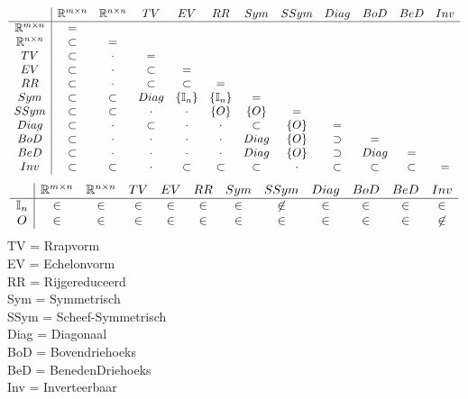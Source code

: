 \documentclass[lineaire_algebra_oplossingen.tex]{subfiles}
\begin{document}
\[
\begin{array}{c | c c c c c c c c c c c}
 & \mathbb{R}^{m\times n} & \mathbb{R}^{n\times n} & TV & EV & RR & Sym & SSym & Diag & BoD & BeD & Inv\\
 \hline
\mathbb{R}^{m\times n} 	& =\\
\mathbb{R}^{n\times n} 	& \subset 	& =\\
TV 						& \subset 	& \cdot 	& =\\
EV 						& \subset 	& \cdot 	& \subset 	& =\\
RR 						& \subset 	& \cdot 	& \subset 	& \subset 			& =\\ 
Sym 					& \subset	& \subset	& Diag		& \{\mathbb{I}_n\}	& \{\mathbb{I}_n\}	& =\\
SSym 					& \subset	& \subset	& \cdot		& \cdot				& \{O\} 		& \{O\}	& =\\
Diag 					& \subset	& \cdot		& \subset	& \cdot				& \cdot				& \subset	& \{O\}	& =\\
BoD 					& \subset	& \cdot		& \cdot		& \cdot 			& \cdot				& Diag				& \{O\}	& \supset	& =\\
BeD 					& \subset	& \cdot		& \cdot		& \cdot 			& \cdot				& Diag				& \{O\} & \supset	& Diag	& =\\
Inv						& \subset	& \subset	& \cdot		& \subset			& \subset			& \subset	& \cdot 		& \subset	& \subset	& \subset 	& =\\
\end{array}\\
\]
\[
\begin{array}{c | c c c c c c c c c c c}
 & \mathbb{R}^{m\times n} & \mathbb{R}^{n\times n} & TV & EV & RR & Sym & SSym & Diag & BoD & BeD & Inv\\
\hline
\mathbb{I}_n 			& \in & \in & \in & \in & \in & \in & \not\in 	& \in & \in & \in & \in \\
O 						& \in & \in & \in & \in & \in & \in & \in 		& \in & \in & \in & \not\in\\
\end{array}\\
\]
TV = Rrapvorm\\
EV = Echelonvorm\\
RR = Rijgereduceerd\\
Sym = Symmetrisch\\
SSym = Scheef-Symmetrisch\\
Diag = Diagonaal\\
BoD = Bovendriehoeks\\
BeD = BenedenDriehoeks\\
Inv = Inverteerbaar\\
\end{document}
